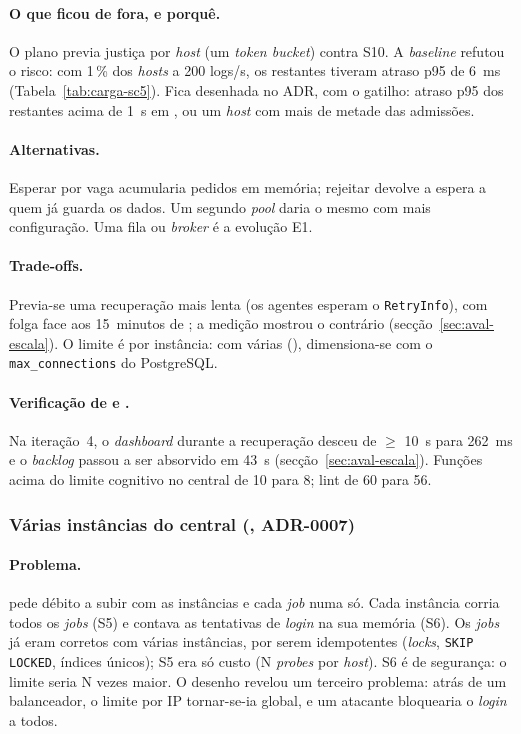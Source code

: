 \paragraph{O que ficou de fora, e porquê.}
O plano previa justiça por \emph{host} (um \emph{token bucket}) contra S10. A \emph{baseline} refutou o risco: com 1\,\%
dos \emph{hosts} a 200 logs/s, os restantes tiveram atraso p95 de 6~ms (Tabela~\ref{tab:carga-sc5}). Fica desenhada
no ADR, com o gatilho: atraso p95 dos restantes acima de 1~s em , ou um \emph{host} com mais de metade das
admissões.

\paragraph{Alternativas.}
Esperar por vaga acumularia pedidos em memória; rejeitar devolve a espera a quem já guarda os dados. Um segundo
\emph{pool} daria o mesmo com mais configuração. Uma fila ou \emph{broker} é a evolução E1.

\paragraph{Trade-offs.}
Previa-se uma recuperação mais lenta (os agentes esperam o \texttt{RetryInfo}), com folga face aos 15~minutos de
; a medição mostrou o contrário (secção~\ref{sec:aval-escala}). O limite é por instância: com várias
(), dimensiona-se com o \texttt{max\_connections} do PostgreSQL.

\paragraph{Verificação de  e .}
Na iteração~4, o \emph{dashboard} durante a recuperação desceu de $\ge$ 10~s para 262~ms e o \emph{backlog} passou
a ser absorvido em 43~s (secção~\ref{sec:aval-escala}). Funções acima do limite cognitivo no central de 10 para 8;
lint de 60 para 56.

\subsubsection{Várias instâncias do central (, ADR-0007)}
\label{sec:d8}

\paragraph{Problema.}
 pede débito a subir com as instâncias e cada \emph{job} numa só. Cada instância corria todos os
\emph{jobs} (S5) e contava as tentativas de \emph{login} na sua memória (S6). Os \emph{jobs} já eram corretos com
várias instâncias, por serem idempotentes (\emph{locks}, \texttt{SKIP LOCKED}, índices únicos); S5 era só custo
(N \emph{probes} por \emph{host}). S6 é de segurança: o limite seria N vezes maior. O desenho revelou um terceiro
problema: atrás de um balanceador, o limite por IP tornar-se-ia global, e um atacante bloquearia o \emph{login} a
todos.

